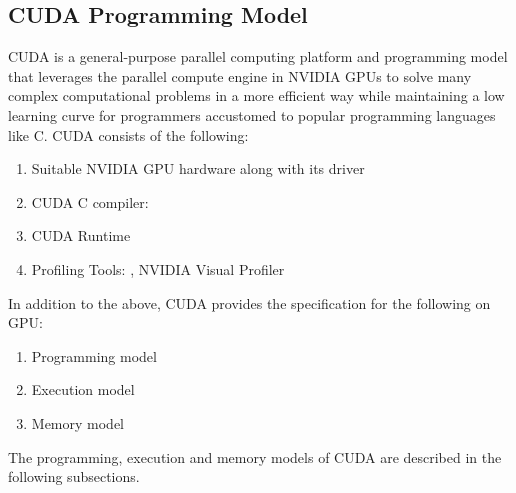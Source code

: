 \documentclass[thesis.tex]{subfiles}
\begin{document}
\subsection{CUDA Programming Model}
CUDA is a general-purpose parallel computing platform and programming model that leverages the parallel compute engine in NVIDIA GPUs to solve many complex computational problems in a more efficient way while maintaining a low learning curve for programmers accustomed to popular programming languages like C.
CUDA consists of the following:
\begin{enumerate}
	\item Suitable NVIDIA GPU hardware along with its driver
	\item CUDA C compiler: 
	\item CUDA Runtime 
	\item Profiling Tools: , NVIDIA Visual Profiler
\end{enumerate}
In addition to the above, CUDA provides the specification for the following on GPU:
\begin{enumerate}
	\item Programming model
	\item Execution model
	\item Memory model
\end{enumerate}
The programming, execution and memory models of CUDA are described in the following subsections.
\end{document}
